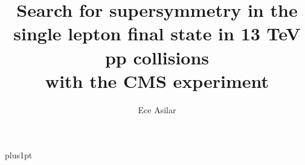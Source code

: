 \documentclass[12pt]{thesis}  %
\title{Search for supersymmetry in the single lepton final state in 13 TeV pp collisions\\with the CMS experiment}
\author{Ece Asilar}             %
\begin{document}
\baselineskip=18pt plus1pt

\setcounter{secnumdepth}{3}
\setcounter{tocdepth}{3}


\maketitle                  %

\begin{romanpages}          %
\tableofcontents            %
\listoffigures              %
\end{romanpages}            %

\begin{preliminaries}

\end{preliminaries}












\appendix



\end{document}
